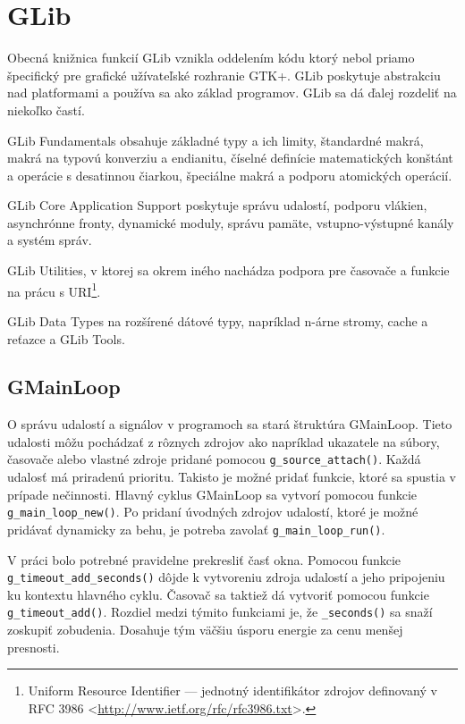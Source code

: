 \documentclass[12pt,oneside,final]{fithesis2}
\begin{document}
\section{GLib}
Obecná knižnica funkcií GLib vznikla oddelením kódu ktorý nebol priamo špecifický pre grafické užívateľské rozhranie GTK+. GLib poskytuje abstrakciu nad platformami a používa sa ako základ programov. GLib sa dá ďalej rozdeliť na niekoľko častí. 

GLib Fundamentals obsahuje základné typy a ich limity, štandardné makrá, makrá na typovú konverziu a endianitu, číselné definície matematických konštánt a operácie s desatinnou čiarkou, špeciálne makrá a podporu atomických operácií. 

GLib Core Application Support poskytuje správu udalostí, podporu vlákien, asynchrónne fronty, dynamické moduly, správu pamäte, vstupno-výstupné kanály a systém správ.
 
GLib Utilities, v ktorej sa okrem iného nachádza podpora pre časovače a funkcie na prácu s URI\footnote{Uniform Resource Identifier --- jednotný identifikátor zdrojov definovaný v RFC 3986 <\url{http://www.ietf.org/rfc/rfc3986.txt}>.}.%

GLib Data Types na rozšírené dátové typy, napríklad n-árne stromy, cache a reťazce a GLib Tools.

\subsection{GMainLoop}O správu udalostí a signálov v programoch sa stará štruktúra GMainLoop. Tieto udalosti môžu pochádzať z rôznych zdrojov ako napríklad ukazatele na súbory, časovače alebo vlastné zdroje pridané pomocou \verb|g_source_attach()|. Každá udalosť má priradenú prioritu. Takisto je možné pridať funkcie, ktoré sa spustia v prípade nečinnosti. Hlavný cyklus GMainLoop sa vytvorí pomocou funkcie \verb|g_main_loop_new()|. Po pridaní úvodných zdrojov udalostí, ktoré je možné pridávať dynamicky za behu, je potreba zavolať \verb|g_main_loop_run()|.

V práci bolo potrebné pravidelne prekresliť časť okna. Pomocou funkcie \verb|g_timeout_add_seconds()| dôjde k vytvoreniu zdroja udalostí a jeho pripojeniu ku kontextu hlavného cyklu. Časovač sa taktiež dá vytvoriť pomocou funkcie \verb|g_timeout_add()|. Rozdiel medzi týmito funkciami je, že \verb|_seconds()| sa snaží zoskupiť zobudenia. Dosahuje tým väčšiu úsporu energie za cenu menšej presnosti.
\end{document}
